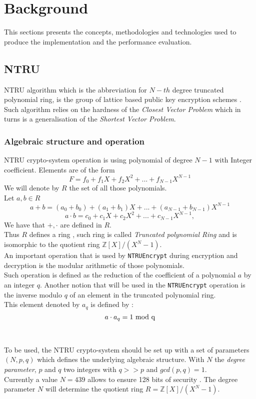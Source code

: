 \section{Background}
\label{sec:background}

This sections presents the concepts, methodologies and technologies used to produce the implementation and the performance evaluation.

\subsection{NTRU}
NTRU algorithm which is the abbreviation for $N-th$ degree truncated polynomial ring, is the group of lattice based public key encryption schemes \cite{hoffstein_ntru:_2006}. \\
Such algorithm relies on the hardness of the \textit{Closest Vector Problem} \cite{micciancio_closest_2003} which in turns is a generalisation of the \textit{Shortest Vector Problem}.
\subsubsection{Algebraic structure and operation}
NTRU crypto-system operation is using polynomial of degree $N-1$ with Integer coefficient. Elements are of the form $$F = f_0+f_1X+f_2X^2+... +f_{N-1}X^{N-1} $$  We will denote by $R$ the set of all those polynomials.\\
Let $a,b \in R$  
$$a+b = (a_0+b_0) + (a_1+b_1)X+...+(a_{N-1}+b_{N-1})X^{N-1}$$
$$ a\cdot b = c_0+c_1X+c_2X^2+...+c_{N-1}X^{N-1}, $$
We have that $+,\cdot $ are defined in $R$. \\Thus $R$ defines a ring , such ring is called \textit{Truncated polynomial Ring} and is isomorphic to the quotient ring $\mathbb{Z}{[X]/(X^N-1)}$.\\
An important operation that is used by \texttt{NTRUEncrypt} during encryption and decryption is the modular arithmetic of those polynomials.\\
Such operation is defined as the reduction of the coefficient of a polynomial $a$ by an integer $q$.
Another notion that will be used in the \texttt{NTRUEncrypt} operation is the inverse modulo $q$ of an element in the truncated polynomial ring.\\ This element denoted by $a_q$ is defined by : $$ a\cdot a_q = 1 \textnormal{ mod q} $$
\\ \\
To be used, the NTRU crypto-system should be set up with a set of parameters $(N,p,q)$ which defines the underlying algebraic structure. With $N$ the \textit{degree parameter}, $p$ and $q$ two integers with $q >> p$ and $gcd(p,q)=1$.\\ Currently a value $N=439$ allows to ensure 128 bits of security \cite{noauthor_open_2018}. The degree parameter $N$ will determine the quotient ring $R=\mathbb{Z}{[X]/(X^N-1)}$.

